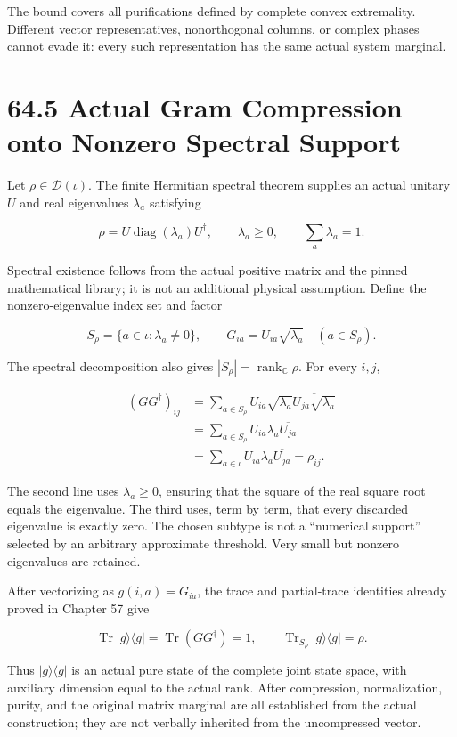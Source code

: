 \documentclass[
  11pt,
  oneside]{book}
\begin{document}
The bound covers all purifications defined by complete convex
extremality. Different vector representatives, nonorthogonal columns, or
complex phases cannot evade it: every such representation has the same
actual system marginal.

\section{64.5 Actual Gram Compression onto Nonzero Spectral Support}

Let \(\rho\in\mathcal D(\iota)\). The finite Hermitian spectral theorem
supplies an actual unitary \(U\) and real eigenvalues \(\lambda_a\)
satisfying

\[
\rho=U\operatorname{diag}(\lambda_a)U^\dagger,
\qquad \lambda_a\ge0,
\qquad \sum_a\lambda_a=1.
\]

Spectral existence follows from the actual positive matrix and the
pinned mathematical library; it is not an additional physical
assumption. Define the nonzero-eigenvalue index set and factor

\[
S_\rho=\{a\in\iota:\lambda_a\ne0\},
\qquad
G_{ia}=U_{ia}\sqrt{\lambda_a}\quad(a\in S_\rho).
\]

The spectral decomposition also gives
\(|S_\rho|=\operatorname{rank}_{\mathbb C}\rho\). For every \(i,j\),

\[
\begin{aligned}
(GG^\dagger)_{ij}
&=\sum_{a\in S_\rho}U_{ia}\sqrt{\lambda_a}
  \overline{U_{ja}\sqrt{\lambda_a}}\\
&=\sum_{a\in S_\rho}U_{ia}\lambda_a\overline{U_{ja}}\\
&=\sum_{a\in\iota}U_{ia}\lambda_a\overline{U_{ja}}
=\rho_{ij}.
\end{aligned}
\]

The second line uses \(\lambda_a\ge0\), ensuring that the square of the
real square root equals the eigenvalue. The third uses, term by term,
that every discarded eigenvalue is exactly zero. The chosen subtype is
not a ``numerical support'' selected by an arbitrary approximate
threshold. Very small but nonzero eigenvalues are retained.

After vectorizing as \(g(i,a)=G_{ia}\), the trace and partial-trace
identities already proved in Chapter 57 give

\[
\operatorname{Tr}|g\rangle\langle g|
=\operatorname{Tr}(GG^\dagger)=1,
\qquad
\operatorname{Tr}_{S_\rho}|g\rangle\langle g|=\rho.
\]

Thus \(|g\rangle\langle g|\) is an actual pure state of the complete
joint state space, with auxiliary dimension equal to the actual rank.
After compression, normalization, purity, and the original matrix
marginal are all established from the actual construction; they are not
verbally inherited from the uncompressed vector.
\end{document}
